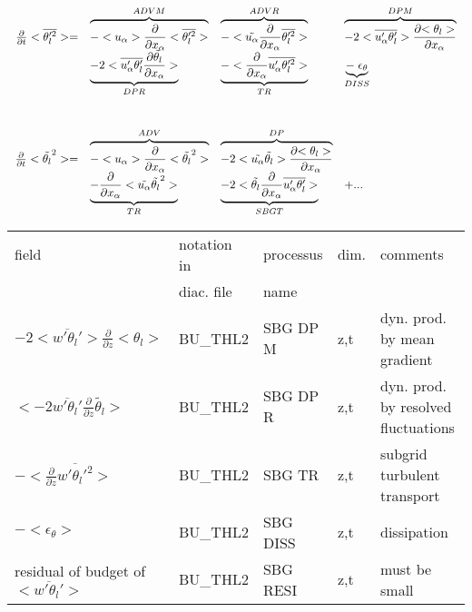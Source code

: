 \begin{displaymath}
\left.
\begin{array}{rllll}
\frac{\partial }{\partial t} <\overline{\theta_l'^2}> = & 
\overbrace{- <u_\alpha>\frac{\partial}{\partial x_\alpha} <\overline{\theta_l'^2}> }^{ADVM}  &
\overbrace{- <\tilde{u_\alpha}\frac{\partial}{\partial x_\alpha} \overline{\theta_l'^2} > }^{ADVR} &
\overbrace{- 2 <\overline{u_\alpha'\theta_l'}> \frac{\partial {<\theta_l>}}{\partial x_\alpha} }^{DPM} \\
\vspace*{1.0cm}
& \underbrace{- 2 <\overline{u'_\alpha \theta_l'} \frac{\partial {\tilde{\theta_l}}}{\partial x_\alpha}>}_{DPR}  &
 \underbrace{- <\frac{\partial}{\partial x_\alpha} \overline{u'_\alpha \theta_l'^2}>}_{TR}
 & \underbrace{-\; \epsilon_{\theta}}_{DISS}\\
\frac{\partial }{\partial t} <\tilde{\theta_l}^2> = & 
\overbrace{- <u_\alpha>\frac{\partial}{\partial x_\alpha} <\tilde{\theta_l}^2> }^{ADV} &
\overbrace{- 2<\tilde{u_\alpha} \tilde{\theta_l}> \frac{\partial {<\theta_l>}}{\partial x_\alpha}}^{DP} &\\
& \underbrace{- \frac{\partial}{\partial x_\alpha} <\tilde{u_\alpha} \tilde{\theta_l}^2>}_{TR} &
\underbrace{- 2 <\tilde{\theta_l}\frac{\partial}{\partial x_\alpha}\overline{u'_\alpha \theta_l'}>}_{SBGT} & + ...
\end{array}
\right.
\end{displaymath}

\begin{center}
\begin{tabular}{||p{5cm}|>{\centering}p{2cm}|>{\centering}p{2.5cm}|>{\centering}p{0.5cm}|p{5.5cm }||}
\hline
\hline
field & notation in & processus & dim.  & comments \\
      & diac. file & name      &            & \\
\hline
\hline
$- 2 <\overline{w'\theta_l'}>\frac{\partial }{\partial z}<\theta_l>$ & BU\_THL2 & SBG DP M & z,t & dyn. prod. by mean gradient \\
\hline
$<-2 \overline{w'\theta_l'}\frac{\partial}{\partial z}\tilde{\theta_l}>$ & BU\_THL2 & SBG DP R & z,t & dyn. prod. by resolved fluctuations\\
\hline
$-<\frac{\partial}{\partial z}\overline{w'\theta_l'^2}>$ & BU\_THL2 & SBG TR   & z,t & subgrid turbulent transport\\
\hline
$-<\epsilon_\theta>$ & BU\_THL2 & SBG DISS & z,t & dissipation \\
\hline
{\rm residual of budget of} $<\overline{w'\theta_l'}>$ & BU\_THL2 & SBG RESI & z,t & must be small \\
\hline
\hline
\end{tabular}
\end{center}

